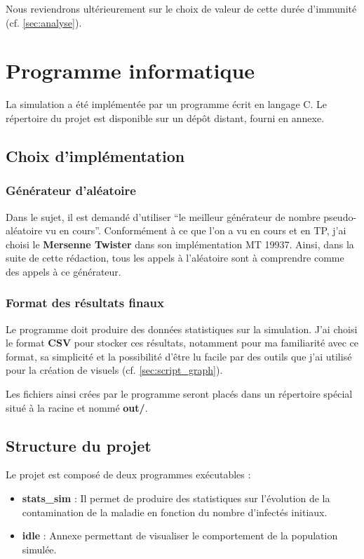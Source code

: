 \documentclass[12pt,french,titlepage]{article}
\begin{document}
Nous reviendrons ultérieurement sur le choix de valeur de cette durée d'immunité (cf. \ref{sec:analyse}).

\newpage



\section{Programme informatique}
La simulation a été implémentée par un programme écrit en langage C. Le répertoire du projet est disponible sur un dépôt distant, fourni en annexe.


\subsection{Choix d'implémentation}
\subsubsection{Générateur d'aléatoire}
Dans le sujet, il est demandé d'utiliser “le meilleur générateur de nombre pseudo-aléatoire vu en cours”. Conformément à ce que l'on a vu en cours et en TP, j'ai choisi le \textbf{Mersenne Twister} dans son implémentation MT 19937. Ainsi, dans la suite de cette rédaction, tous les appels à l'aléatoire sont à comprendre comme des appels à ce générateur.

\subsubsection{Format des résultats finaux}
Le programme doit produire des données statistiques sur la simulation. J'ai choisi le format \textbf{CSV} pour stocker ces résultats, notamment pour ma familiarité avec ce format, sa simplicité et la possibilité d'être lu facile par des outils que j'ai utilisé pour la création de visuels (cf. \ref{sec:script_graph}).

Les fichiers ainsi crées par le programme seront placés dans un répertoire spécial situé à la racine et nommé \textbf{out/}.


\subsection{Structure du projet}


Le projet est composé de deux programmes exécutables :

\begin{itemize}
\item \textbf{stats\_sim} : Il permet de produire des statistiques sur l'évolution de la contamination de la maladie en fonction du nombre d'infectés initiaux.
\item \textbf{idle} : Annexe permettant de visualiser le comportement de la population simulée.\\
\end{itemize}
\end{document}
